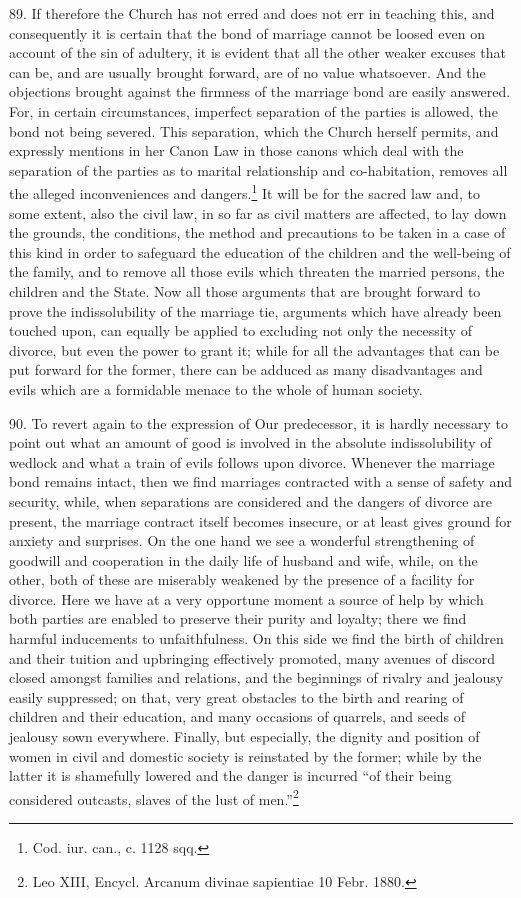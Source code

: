 \documentclass[12pt,a4paper]{book}
\begin{document}
89. If therefore the Church has not erred and does not err in teaching this, and consequently it is certain that the bond of marriage cannot be loosed even on account of the sin of adultery, it is evident that all the other weaker excuses that can be, and are usually brought forward, are of no value whatsoever. And the objections brought against the firmness of the marriage bond are easily answered. For, in certain circumstances, imperfect separation of the parties is allowed, the bond not being severed. This separation, which the Church herself permits, and expressly mentions in her Canon Law in those canons which deal with the separation of the parties as to marital relationship and co-habitation, removes all the alleged inconveniences and dangers.\footnote{Cod. iur. can., c. 1128 sqq.} It will be for the sacred law and, to some extent, also the civil law, in so far as civil matters are affected, to lay down the grounds, the conditions, the method and precautions to be taken in a case of this kind in order to safeguard the education of the children and the well-being of the family, and to remove all those evils which threaten the married persons, the children and the State. Now all those arguments that are brought forward to prove the indissolubility of the marriage tie, arguments which have already been touched upon, can equally be applied to excluding not only the necessity of divorce, but even the power to grant it; while for all the advantages that can be put forward for the former, there can be adduced as many disadvantages and evils which are a formidable menace to the whole of human society.

90. To revert again to the expression of Our predecessor, it is hardly necessary to point out what an amount of good is involved in the absolute indissolubility of wedlock and what a train of evils follows upon divorce. Whenever the marriage bond remains intact, then we find marriages contracted with a sense of safety and security, while, when separations are considered and the dangers of divorce are present, the marriage contract itself becomes insecure, or at least gives ground for anxiety and surprises. On the one hand we see a wonderful strengthening of goodwill and cooperation in the daily life of husband and wife, while, on the other, both of these are miserably weakened by the presence of a facility for divorce. Here we have at a very opportune moment a source of help by which both parties are enabled to preserve their purity and loyalty; there we find harmful inducements to unfaithfulness. On this side we find the birth of children and their tuition and upbringing effectively promoted, many avenues of discord closed amongst families and relations, and the beginnings of rivalry and jealousy easily suppressed; on that, very great obstacles to the birth and rearing of children and their education, and many occasions of quarrels, and seeds of jealousy sown everywhere. Finally, but especially, the dignity and position of women in civil and domestic society is reinstated by the former; while by the latter it is shamefully lowered and the danger is incurred ``of their being considered outcasts, slaves of the lust of men.''\footnote{Leo XIII, Encycl. Arcanum divinae sapientiae 10 Febr. 1880.}
\end{document}
